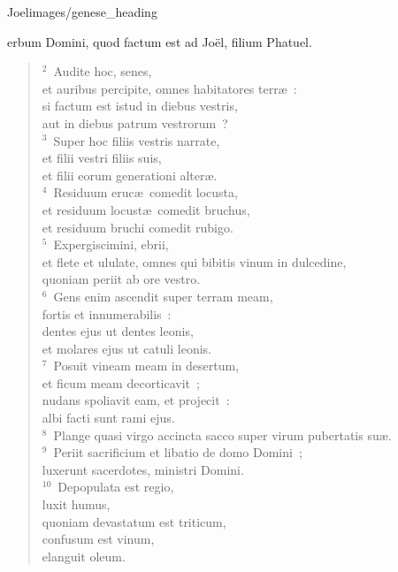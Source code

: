 {Joel}{images/genese_heading}


\bchapter
{}erbum Domini, quod factum est ad Jo\"el, filium Phatuel.
\begin{flushleft}\begin{verse}\vspace{6pt}${}^{2}$~Audite hoc, senes,\\ et auribus percipite, omnes habitatores terr\ae~:\\ si factum est istud in diebus vestris,\\ aut in diebus patrum vestrorum~?\\
${}^{3}$~Super hoc filiis vestris narrate,\\ et filii vestri filiis suis,\\ et filii eorum generationi alter\ae .\\
${}^{4}$~Residuum eruc\ae\ comedit locusta,\\ et residuum locust\ae\ comedit bruchus,\\ et residuum bruchi comedit rubigo.\\
${}^{5}$~Expergiscimini, ebrii,\\ et flete et ululate, omnes qui bibitis vinum in dulcedine,\\ quoniam periit ab ore vestro.\\
${}^{6}$~Gens enim ascendit super terram meam,\\ fortis et innumerabilis~:\\ dentes ejus ut dentes leonis,\\ et molares ejus ut catuli leonis.\\
${}^{7}$~Posuit vineam meam in desertum,\\ et ficum meam decorticavit~;\\ nudans spoliavit eam, et projecit~:\\ albi facti sunt rami ejus.\\
${}^{8}$~Plange quasi virgo accincta sacco super virum pubertatis su\ae .\\
${}^{9}$~Periit sacrificium et libatio de domo Domini~;\\ luxerunt sacerdotes, ministri Domini.\\
${}^{10}$~Depopulata est regio,\\ luxit humus,\\ quoniam devastatum est triticum,\\ confusum est vinum,\\ elanguit oleum.\\

\end{verse}
\end{flushleft}
